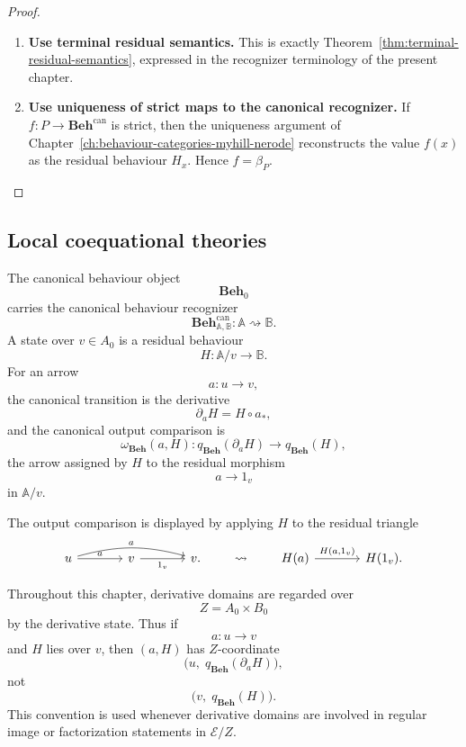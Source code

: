 \begin{proof}
    \leavevmode
    \begin{enumerate}
        \item \textbf{Use terminal residual semantics.}
        This is exactly Theorem~\ref{thm:terminal-residual-semantics}, expressed
        in the recognizer terminology of the present chapter.

        \item \textbf{Use uniqueness of strict maps to the canonical recognizer.}
        If \(f:P\to\mathbf{Beh}^{\mathrm{can}}\) is strict, then the uniqueness
        argument of Chapter~\ref{ch:behaviour-categories-myhill-nerode}
        reconstructs the value \(f(x)\) as the residual behaviour \(H_x\). Hence
        \(f=\beta_P\).
    \end{enumerate}
\end{proof}

\subsection{Local coequational theories}
\label{subsec:local-coequational-theories}

The canonical behaviour object
\[
    \mathbf{Beh}_0
\]
carries the canonical behaviour recognizer
\[
    \mathbf{Beh}^{\mathrm{can}}_{\mathbb A,\mathbb B}:
    \mathbb A\rightsquigarrow\mathbb B.
\]
A state over \(v\in A_0\) is a residual behaviour
\[
    H:\mathbb A/v\to\mathbb B.
\]
For an arrow
\[
    a:u\to v,
\]
the canonical transition is the derivative
\[
    \partial_aH=H\circ a_*,
\]
and the canonical output comparison is
\[
    \omega_{\mathbf{Beh}}(a,H):
    q_{\mathbf{Beh}}(\partial_aH)\to q_{\mathbf{Beh}}(H),
\]
the arrow assigned by \(H\) to the residual morphism
\[
    a\to 1_v
\]
in \(\mathbb A/v\).

The output comparison is displayed by applying \(H\) to the residual triangle
\[
\begin{tikzcd}[column sep=large, row sep=large]
    u
        \arrow[r, "a"]
        \arrow[rr, "a", bend left=15]
    &
    v
        \arrow[r, "1_v"']
    &
    v .
\end{tikzcd}
\qquad
\leadsto
\qquad
\begin{tikzcd}[column sep=large, row sep=large]
    H(a)
        \arrow[r, "{H(a,1_v)}"]
    &
    H(1_v).
\end{tikzcd}
\]

Throughout this chapter, derivative domains are regarded over
\[
    Z=A_0\times B_0
\]
by the derivative state. Thus if
\[
    a:u\to v
\]
and \(H\) lies over \(v\), then \((a,H)\) has \(Z\)-coordinate
\[
    \bigl(u,\;q_{\mathbf{Beh}}(\partial_aH)\bigr),
\]
not
\[
    \bigl(v,\;q_{\mathbf{Beh}}(H)\bigr).
\]
This convention is used whenever derivative domains are involved in regular
image or factorization statements in \(\mathcal E/Z\).

